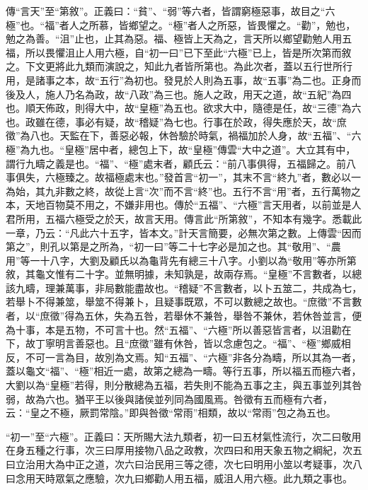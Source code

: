 {\noindent\zhuan{}\fzbyks 傳“言天”至“第敘”。正義曰：“貧”、“弱”等六者，皆謂窮極惡事，故目之“六極”也。“福”者人之所慕，皆鄉望之。“極”者人之所惡，皆畏懼之。“勸”，勉也，勉之為善。“沮”止也，止其為惡。福、極皆上天為之，言天所以鄉望勸勉人用五福，所以畏懼沮止人用六極，自“初一曰”已下至此“六極”已上，皆是所次第而敘之。下文更將此九類而演說之，知此九者皆所第也。為此次者，蓋以五行世所行用，是諸事之本，故“五行”為初也。發見於人則為五事，故“五事”為二也。正身而後及人，施人乃名為政，故“八政”為三也。施人之政，用天之道，故“五紀”為四也。順天佈政，則得大中，故“皇極”為五也。欲求大中，隨德是任，故“三德”為六也。政雖在德，事必有疑，故“稽疑”為七也。行事在於政，得失應於天，故“庶徵”為八也。天監在下，善惡必報，休咎驗於時氣，禍福加於人身，故“五福”、“六極”為九也。“皇極”居中者，總包上下，故“皇極”傳雲“大中之道”。大立其有中，謂行九疇之義是也。“福”、“極”處末者，顧氏云：“前八事俱得，五福歸之。前八事俱失，六極臻之。故福極處末也。”發首言“初一”，其末不言“終九”者，數必以一為始，其九非數之終，故從上言“次”而不言“終”也。五行不言“用”者，五行萬物之本，天地百物莫不用之，不嫌非用也。傳於“五福”、“六極”言天用者，以前並是人君所用，五福六極受之於天，故言天用。傳言此“所第敘”，不知本有幾字。悉載此一章，乃云：“凡此六十五字，皆本文。”計天言簡要，必無次第之數。上傳雲“因而第之”，則孔以第是之所為，“初一曰”等二十七字必是加之也。其“敬用”、“農用”等一十八字，大劉及顧氏以為龜背先有總三十八字。小劉以為“敬用”等亦所第敘，其龜文惟有二十字。並無明據，未知孰是，故兩存焉。“皇極”不言數者，以總該九疇，理兼萬事，非局數能盡故也。“稽疑”不言數者，以卜五筮二，共成為七，若舉卜不得兼筮，舉筮不得兼卜，且疑事既眾，不可以數總之故也。“庶徵”不言數者，以“庶徵”得為五休，失為五咎，若舉休不兼咎，舉咎不兼休，若休咎並言，便為十事，本是五物，不可言十也。然“五福”、“六極”所以善惡皆言者，以沮勸在下，故丁寧明言善惡也。且“庶徵”雖有休咎，皆以念慮包之。“福”、“極”鄉威相反，不可一言為目，故別為文焉。知“五福”、“六極”非各分為疇，所以其為一者，蓋以龜文“福”、“極”相近一處，故第之總為一疇。等行五事，所以福五而極六者，大劉以為“皇極”若得，則分散總為五福，若失則不能為五事之主，與五事並列其咎弱，故為六也。猶平王以後與諸侯並列同為國風焉。咎徵有五而極有六者，云：“皇之不極，厥罰常陰。”即與咎徵“常雨”相類，故以“常雨”包之為五也。 \par}

{\noindent\shu{}\fzkt “初一”至“六極”。正義曰：天所賜大法九類者，初一曰五材氣性流行，次二曰敬用在身五種之行事，次三曰厚用接物八品之政教，次四曰和用天象五物之綱紀，次五曰立治用大為中正之道，次六曰治民用三等之德，次七曰明用小筮以考疑事，次八曰念用天時眾氣之應驗，次九曰鄉勸人用五福，威沮人用六極。此九類之事也。 \par}

